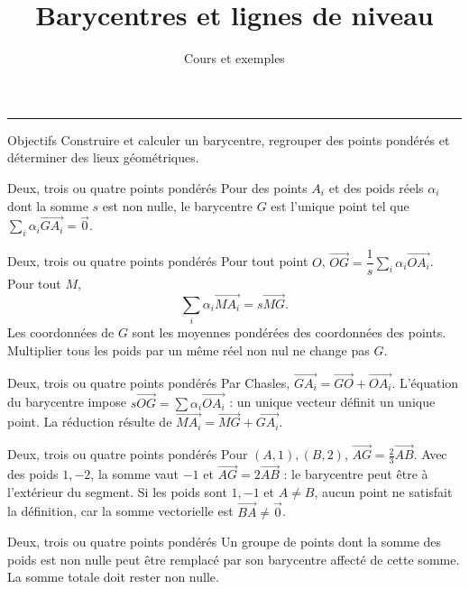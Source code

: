 \documentclass[aspectratio=169,10pt]{beamer}
\title{Barycentres et lignes de niveau}
\subtitle{Cours et exemples}
\date{}
\author{}
\begin{document}
\begin{frame}[plain]
\vfill
{\inserttitle\par}
\medskip
{\insertsubtitle\par}
\medskip
{\rule{\textwidth}{.5pt}}
\vfill
\end{frame}
\begin{frame}{Objectifs}
Construire et calculer un barycentre, regrouper des points pondérés et déterminer des lieux géométriques.
\end{frame}
\begin{frame}{Deux, trois ou quatre points pondérés}
Pour des points \(A_i\) et des poids réels \(\alpha_i\) dont la somme \(s\) est non nulle, le barycentre \(G\) est l’unique point tel que \(\sum_i\alpha_i\overrightarrow{GA_i}=\vec0\).
\end{frame}
\begin{frame}{Deux, trois ou quatre points pondérés}
Pour tout point \(O\), \(\overrightarrow{OG}=\dfrac1s\sum_i\alpha_i\overrightarrow{OA_i}\). Pour tout \(M\),
\[
\sum_i\alpha_i\overrightarrow{MA_i}=s\overrightarrow{MG}.
\]
Les coordonnées de \(G\) sont les moyennes pondérées des coordonnées des points. Multiplier tous les poids par un même réel non nul ne change pas \(G\).
\end{frame}
\begin{frame}{Deux, trois ou quatre points pondérés}
Par Chasles, \(\overrightarrow{GA_i}=\overrightarrow{GO}+\overrightarrow{OA_i}\). L’équation du barycentre impose \(s\overrightarrow{OG}=\sum\alpha_i\overrightarrow{OA_i}\) : un unique vecteur définit un unique point. La réduction résulte de \(\overrightarrow{MA_i}=\overrightarrow{MG}+\overrightarrow{GA_i}\).
\end{frame}
\begin{frame}{Deux, trois ou quatre points pondérés}
Pour \((A,1),(B,2)\), \(\overrightarrow{AG}=\tfrac23\overrightarrow{AB}\). Avec des poids \(1,-2\), la somme vaut \(-1\) et \(\overrightarrow{AG}=2\overrightarrow{AB}\) : le barycentre peut être à l’extérieur du segment. Si les poids sont \(1,-1\) et \(A\ne B\), aucun point ne satisfait la définition, car la somme vectorielle est \(\overrightarrow{BA}\ne\vec0\).
\end{frame}
\begin{frame}{Deux, trois ou quatre points pondérés}
Un groupe de points dont la somme des poids est non nulle peut être remplacé par son barycentre affecté de cette somme. La somme totale doit rester non nulle.
\end{frame}
\end{document}
